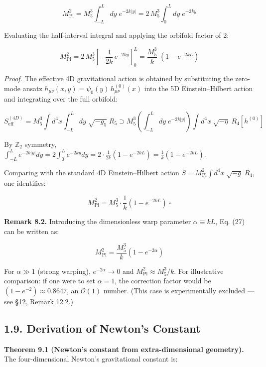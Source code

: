 \documentclass[
  11pt,
]{article}
\begin{document}
\[M_{\text{Pl}}^2 = M_5^3 \int_{-L}^{L} dy\;e^{-2k|y|} = 2\,M_5^3 \int_0^L dy\;e^{-2ky} \tag{26}\]

Evaluating the half-interval integral and applying the orbifold factor
of 2:

\[M_{\text{Pl}}^2 = 2\,M_5^3\left[-\frac{1}{2k}\,e^{-2ky}\right]_0^L = \frac{M_5^3}{k}\;\left(1 - e^{-2kL}\right) \tag{27}\]

\emph{Proof.} The effective 4D gravitational action is obtained by
substituting the zero-mode ansatz
\(h_{\mu\nu}(x,y) = \psi_0(y)\,h_{\mu\nu}^{(0)}(x)\) into the 5D
Einstein--Hilbert action and integrating over the full orbifold:

\[S_{\text{eff}}^{(4D)} = M_5^3 \int d^4x \int_{-L}^{L} dy\;\sqrt{-g_5}\;R_5 \supset M_5^3\left(\int_{-L}^{L} dy\;e^{-2k|y|}\right)\int d^4x\;\sqrt{-\eta}\;R_4[h^{(0)}] \tag{28}\]

By \(\mathbb{Z}_2\) symmetry,
\(\int_{-L}^{L} e^{-2k|y|}dy = 2\int_0^L e^{-2ky}dy = 2 \cdot \frac{1}{2k}(1 - e^{-2kL}) = \frac{1}{k}(1 - e^{-2kL})\).

Comparing with the standard 4D Einstein--Hilbert action
\(S = M_{\text{Pl}}^2\int d^4x\;\sqrt{-g}\;R_4\), one identifies:

\[M_{\text{Pl}}^2 = M_5^3 \cdot \frac{1}{k}\left(1 - e^{-2kL}\right) \;\square \tag{29}\]

\textbf{Remark 8.2.} Introducing the dimensionless warp parameter
\(\alpha \equiv kL\), Eq. (27) can be written as:

\[M_{\text{Pl}}^2 = \frac{M_5^3}{k}\left(1 - e^{-2\alpha}\right) \tag{30}\]

For \(\alpha \gg 1\) (strong warping), \(e^{-2\alpha} \to 0\) and
\(M_{\text{Pl}}^2 \approx M_5^3/k\). For illustrative comparison: if one
were to set \(\alpha = 1\), the correction factor would be
\((1 - e^{-2}) \approx 0.8647\), an \(\mathcal{O}(1)\) number. (This
case is experimentally excluded --- see §12, Remark 12.2.)

\bigskip

\hypertarget{derivation-of-newtons-constant}{%
\subsection{1.9. Derivation of Newton's
Constant}\label{derivation-of-newtons-constant}}

\textbf{Theorem 9.1 (Newton's constant from extra-dimensional
geometry).} The four-dimensional Newton's gravitational constant is:
\end{document}
